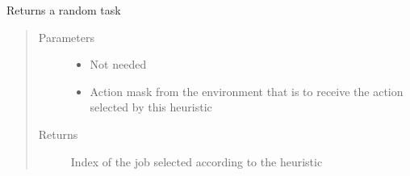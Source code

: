 \documentclass[letterpaper,10pt,english]{sphinxmanual}
\begin{document}
\begin{fulllineitems}
\label{\detokenize{agents.heuristic:agents.heuristic.heuristic_agent.random_task}}
\sphinxAtStartPar
Returns a random task
\begin{quote}\begin{description}
\item[{Parameters}] \leavevmode\begin{itemize}
\item {} 
\sphinxAtStartPar
{} \textendash{} Not needed

\item {} 
\sphinxAtStartPar
{} \textendash{} Action mask from the environment that is to receive the action selected by this heuristic

\end{itemize}

\item[{Returns}] \leavevmode
\sphinxAtStartPar
Index of the job selected according to the heuristic

\end{description}\end{quote}

\end{fulllineitems}

\end{document}

